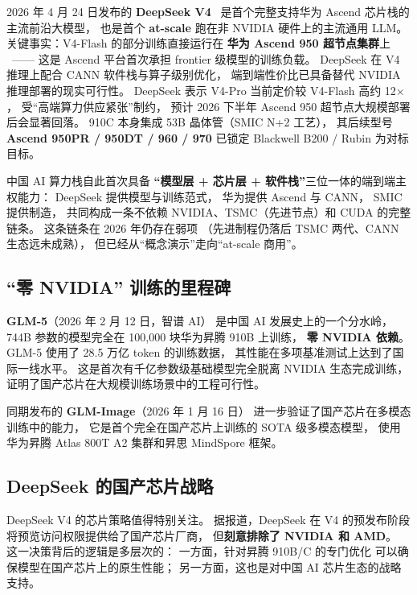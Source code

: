 2026 年 4 月 24 日发布的 \textbf{DeepSeek V4}~\cite{deepseek_v4_release_2026}
是首个完整支持华为 Ascend 芯片栈的主流前沿大模型，
也是首个 \textbf{at-scale} 跑在非 NVIDIA 硬件上的主流通用 LLM。
关键事实：V4-Flash 的部分训练直接运行在
\textbf{华为 Ascend 950 超节点集群}上%
~\cite{deepseek_v4_huawei_2026}——
这是 Ascend 平台首次承担 frontier 级模型的训练负载。
DeepSeek 在 V4 推理上配合 CANN 软件栈与算子级别优化，
端到端性价比已具备替代 NVIDIA 推理部署的现实可行性。
DeepSeek 表示 V4-Pro 当前定价较 V4-Flash 高约 12$\times$，
受“高端算力供应紧张”制约，
预计 2026 下半年 Ascend 950 超节点大规模部署后会显著回落。
910C 本身集成 53B 晶体管（SMIC N+2 工艺），
其后续型号 \textbf{Ascend 950PR / 950DT / 960 / 970}
已锁定 Blackwell B200 / Rubin 为对标目标。

中国 AI 算力栈自此首次具备
\textbf{“模型层 + 芯片层 + 软件栈”}三位一体的端到端主权能力：
DeepSeek 提供模型与训练范式，
华为提供 Ascend 与 CANN，
SMIC 提供制造，
共同构成一条不依赖 NVIDIA、TSMC（先进节点）和 CUDA 的完整链条。
这条链条在 2026 年仍存在弱项
（先进制程仍落后 TSMC 两代、CANN 生态远未成熟），
但已经从“概念演示”走向“at-scale 商用”。

\subsection{“零 NVIDIA” 训练的里程碑}

\textbf{GLM-5}（2026 年 2 月 12 日，智谱 AI）
是中国 AI 发展史上的一个分水岭，
744B 参数的模型完全在 100,000 块华为昇腾 910B 上训练，
\textbf{零 NVIDIA 依赖}。
GLM-5 使用了 28.5 万亿 token 的训练数据，
其性能在多项基准测试上达到了国际一线水平。
这是首次有千亿参数级基础模型完全脱离 NVIDIA 生态完成训练，
证明了国产芯片在大规模训练场景中的工程可行性。

同期发布的 \textbf{GLM-Image}（2026 年 1 月 16 日）
进一步验证了国产芯片在多模态训练中的能力，
它是首个完全在国产芯片上训练的 SOTA 级多模态模型，
使用华为昇腾 Atlas 800T A2 集群和昇思 MindSpore 框架。

\subsection{DeepSeek 的国产芯片战略}

DeepSeek V4 的芯片策略值得特别关注。
据报道，DeepSeek 在 V4 的预发布阶段
将预览访问权限提供给了国产芯片厂商，
但\textbf{刻意排除了 NVIDIA 和 AMD}。
这一决策背后的逻辑是多层次的：
一方面，针对昇腾 910B/C 的专门优化
可以确保模型在国产芯片上的原生性能；
另一方面，这也是对中国 AI 芯片生态的战略支持。

